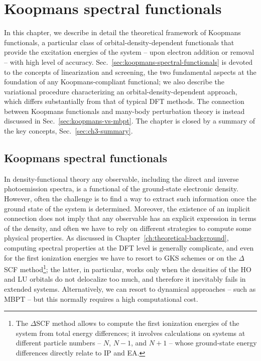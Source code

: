 \cleardoublepage
\chapter{Koopmans spectral functionals\label{ch:koopmans-theory}}

In this chapter, we describe in detail the theoretical framework of Koopmans functionals, a particular class of orbital-density-dependent functionals that provide the excitation energies of the system -- upon electron addition or removal -- with high level of accuracy. Sec.~\ref{sec:koopmans-spectral-functionals} is devoted to the concepts of linearization and screening, the two fundamental aspects at the foundation of any Koopmans-compliant functional; we also describe the variational procedure characterizing an orbital-density-dependent approach, which differs substantially from that of typical DFT methods. The connection between Koopmans functionals and many-body perturbation theory is instead discussed in Sec.~\ref{sec:koopmans-vs-mbpt}. The chapter is closed by a summary of the key concepts, Sec.~\ref{sec:ch3-summary}.

\clearpage
\section{Koopmans spectral functionals\label{sec:koopmans-spectral-functionals}}
In density-functional theory any observable, including the direct and inverse photoemission spectra, is a functional of the ground-state electronic density. However, often the challenge is to find a way to extract such information once the ground state of the system is determined. Moreover, the existence of an implicit connection does not imply that any observable has an explicit expression in terms of the density, and often we have to rely on different strategies to compute some physical properties. As discussed in Chapter~\ref{ch:theoretical-background}, computing spectral properties at the DFT level is generally complicate, and even for the first ionization energies we have to resort to GKS schemes or on the $\Delta$SCF method\footnote{The $\Delta$SCF method allows to compute the first ionization energies of the system from total energy differences; it involves calculations on systems at different particle numbers -- $N$, $N-1$, and $N+1$ -- whose ground-state energy differences directly relate to IP and EA.}; the latter, in particular, works only when the densities of the HO and LU orbitals do not delocalize too much, and therefore it inevitably fails in extended systems. Alternatively, we can resort to dynamical approaches -- such as MBPT -- but this normally requires a high computational cost.

